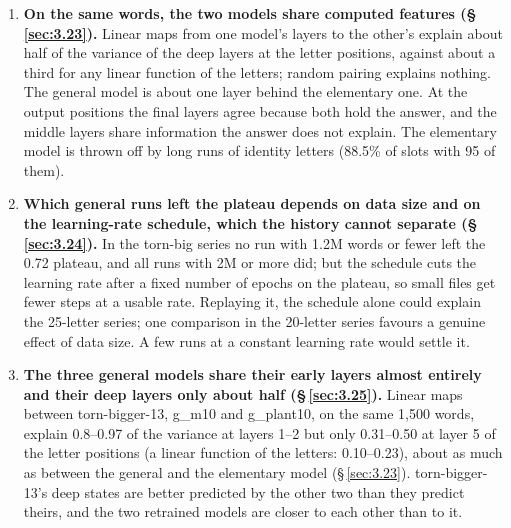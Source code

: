 \documentclass[paper=a4,fontsize=11pt,DIV=11,parskip=half,headings=small,numbers=noendperiod]{scrartcl}
\DeclareRobustCommand{\lead}[1]{\textsf{\bfseries\color{accent}#1}}
\DeclareRobustCommand{\code}[1]{{\fontseries{m}\ttfamily #1}}
\begin{document}
\begin{enumerate}
  one constant per position \code{torn-\allowbreak{}bigger-\allowbreak{}13} passes (0.953 of words), and its
  smallest faithful pruned graph (0.957 of words) decompiles to at most 213,335 lines of D-RASP, 0.13\% of the
  full $1.7 imes10^{8}$ but four orders of magnitude more than the paper’s successful decompilations; it keeps
  27 of 30 heads and all five MLPs. The elementary model’s LayerNorm cannot be linearised even per position (0
  of 1,000 words match).
\item \lead{On the same words, the two models share computed features (\S\,\ref{sec:3.23}).} Linear maps from
  one model’s layers to the other’s explain about half of the variance of the deep layers at the letter
  positions, against about a third for any linear function of the letters; random pairing explains nothing. The
  general model is about one layer behind the elementary one. At the output positions the final layers agree
  because both hold the answer, and the middle layers share information the answer does not explain. The
  elementary model is thrown off by long runs of identity letters (88.5\% of slots with 95 of them).
\item \lead{Which general runs left the plateau depends on data size and on the learning-rate schedule, which
  the history cannot separate (\S\,\ref{sec:3.24}).} In the \code{torn-\allowbreak{}big} series no run with 1.2M
  words or fewer left the 0.72 plateau, and all runs with 2M or more did; but the schedule cuts the learning
  rate after a fixed number of epochs on the plateau, so small files get fewer steps at a usable rate. Replaying
  it, the schedule alone could explain the 25-letter series; one comparison in the 20-letter series favours a
  genuine effect of data size. A few runs at a constant learning rate would settle it.
\item \lead{The three general models share their early layers almost entirely and their deep layers only about
  half (\S\,\ref{sec:3.25}).} Linear maps between \code{torn-\allowbreak{}bigger-\allowbreak{}13},
  \code{g\_\allowbreak{}m10} and \code{g\_\allowbreak{}plant10}, on the same 1,500 words, explain 0.8–0.97 of
  the variance at layers 1–2 but only 0.31–0.50 at layer 5 of the letter positions (a linear function of the
  letters: 0.10–0.23), about as much as between the general and the elementary model (\S\,\ref{sec:3.23}).
  \code{torn-\allowbreak{}bigger-\allowbreak{}13}’s deep states are better predicted by the other two than they
  predict theirs, and the two retrained models are closer to each other than to it.

\end{enumerate}
\end{document}
